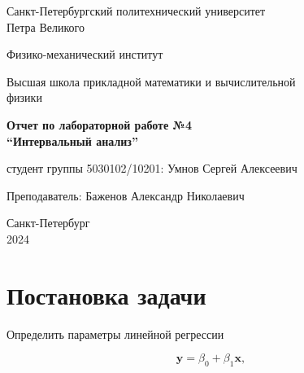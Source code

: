 \documentclass{article}
\begin{document}
  \begin{titlepage}
    \begin{center}
      Санкт-Петербургский политехнический университет \\Петра Великого
    \end{center}

    \begin{center}
      Физико-механический институт
    \end{center}

    \begin{center}
      Высшая школа прикладной математики и вычислительной\\ физики
    \end{center}

    \vspace{8em}

    \begin{center}
      \textbf{Отчет по лабораторной работе №4}\\
      \textbf{“Интервальный анализ”}
    \end{center}

    \vspace{\fill}

    \begin{flushright}
       студент группы 5030102/10201:
      \hfill
      Умнов Сергей Алексеевич \\
    \end{flushright}
    Преподаватель: \hfill Баженов Александр Николаевич

    \vspace{12em}

    \begin{center}
      Санкт-Петербург\\
      2024
    \end{center}
  \end{titlepage}

  \tableofcontents

  \newpage

  \section{Постановка задачи}

  Определить параметры линейной регрессии

  \begin{equation} \label{eq:islau}
    \mathbf{y} = \beta_0 + \beta_1 \mathbf{x},
  \end{equation}
\end{document}
